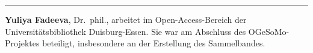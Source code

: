\begin{center}\rule{0.5\linewidth}{0.5pt}\end{center}

\textbf{Yuliya Fadeeva}, Dr.~phil., arbeitet im Open-Access-Bereich der
Universitätsbibliothek Duisburg-Essen. Sie war am Abschluss des
OGeSoMo-Projektes beteiligt, insbesondere an der Erstellung des
Sammelbandes.
